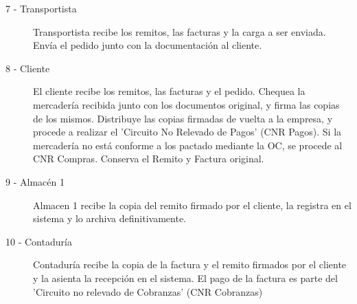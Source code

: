 \begin{description}
	\item[7 - Transportista] Transportista recibe los remitos, las facturas y la carga a ser enviada. Env\'ia el pedido junto con la documentaci\'on al cliente. 
	\item[8 - Cliente] El cliente recibe los remitos, las facturas y el pedido. Chequea la mercader\'ia recibida junto con los documentos original, y firma las copias de los mismos. Distribuye las copias firmadas de vuelta a la empresa, y procede a realizar el 'Circuito No Relevado de Pagos' (CNR Pagos). Si la mercader\'ia no est\'a conforme a los pactado mediante la OC, se procede al CNR Compras. Conserva el Remito y Factura original.
	\item[9 - Almac\'en 1] Almacen 1 recibe la copia del remito firmado por el cliente, la registra en el sistema y lo archiva definitivamente. 
	\item[10 - Contadur\'ia] Contadur\'ia recibe la copia de la factura y el remito firmados por el cliente y la asienta la recepci\'on en el sistema. El pago de la factura es parte del 'Circuito no relevado de Cobranzas' (CNR Cobranzas)
\end{description}


